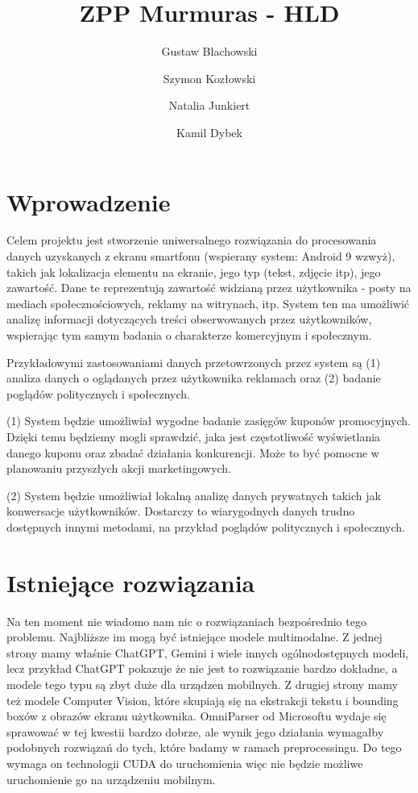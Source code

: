 \documentclass[12pt]{article}
\title{ZPP Murmuras - HLD}
\author{Gustaw Blachowski \and Szymon Kozłowski \and Natalia Junkiert \and Kamil Dybek}
\date{}
\begin{document}
\maketitle

\section*{Wprowadzenie}

Celem projektu jest stworzenie uniwersalnego rozwiązania do procesowania danych uzyskanych z ekranu smartfonu (wspierany system: Android 9 wzwyż), takich jak lokalizacja elementu na ekranie, jego typ (tekst, zdjęcie itp), jego zawartość.
Dane te reprezentują zawartość widzianą przez użytkownika - posty na mediach społecznościowych, reklamy na witrynach, itp.
System ten ma umożliwić analizę informacji dotyczących treści obserwowanych przez użytkowników, wspierając tym samym badania o charakterze komercyjnym i społecznym.

Przykładowymi zastosowaniami danych przetowrzonych przez system są (1) analiza danych o oglądanych przez użytkownika reklamach oraz (2) badanie poglądów politycznych i społecznych.

(1) System będzie umożliwiał wygodne badanie zasięgów kuponów promocyjnych. Dzięki temu będziemy mogli sprawdzić, jaka jest częstotliwość wyświetlania danego kuponu oraz zbadać działania konkurencji. Może to być pomocne w planowaniu przyszłych akcji marketingowych.

(2) System będzie umożliwiał lokalną analizę danych prywatnych takich jak konwersacje użytkowników. Dostarczy to wiarygodnych danych trudno dostępnych innymi metodami, na przykład poglądów politycznych i społecznych.


\section*{Istniejące rozwiązania}
Na ten moment nie wiadomo nam nic o rozwiązaniach bezpośrednio tego problemu. Najbliższe im mogą być istniejące modele multimodalne.
Z jednej strony mamy właśnie ChatGPT, Gemini i wiele innych ogólnodostępnych modeli, lecz przykład ChatGPT pokazuje że nie jest to rozwiązanie bardzo dokładne, a modele tego typu są zbyt duże dla urządzen mobilnych. Z drugiej strony mamy też modele Computer Vision, które skupiają się na ekstrakcji tekstu i bounding boxów z obrazów ekranu użytkownika. OmniParser od Microsoftu wydaje się sprawować w tej kwestii bardzo dobrze, ale wynik jego działania wymagałby podobnych rozwiązań do tych, które badamy w ramach preprocessingu. Do tego wymaga on technologii CUDA do uruchomienia więc nie będzie możliwe uruchomienie go na urządzeniu mobilnym.
\end{document}
